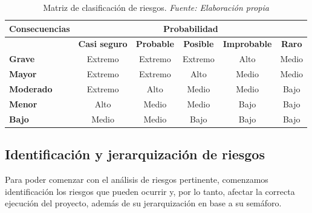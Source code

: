 \begin{table}[H]
	\centering
	\begin{tabular}{|>{\centering\arraybackslash}m{2.5cm}|c|c|c|c|c|}
		\hline
		\rowcolor{black!75} \color{white} {\textbf{Consecuencias}} & \multicolumn{5}{c|}{ \color{white} \textbf{Probabilidad}} \\ \cline{2-6}
		\cellcolor{white} & \textbf{Casi seguro} & \textbf{Probable} & \textbf{Posible} & \textbf{Improbable} & \textbf{Raro} \\ \hline
		\textbf{Grave} & \cellcolor{red!80}Extremo & \cellcolor{red!80}Extremo & \cellcolor{red!80}Extremo & \cellcolor{orange!80}Alto & \cellcolor{yellow!60}Medio \\ \hline
		\textbf{Mayor} & \cellcolor{red!80}Extremo & \cellcolor{red!80}Extremo & \cellcolor{orange!80}Alto & \cellcolor{yellow!60}Medio & \cellcolor{yellow!60}Medio \\ \hline
		\textbf{Moderado} & \cellcolor{red!80}Extremo & \cellcolor{orange!80}Alto & \cellcolor{yellow!60}Medio & \cellcolor{yellow!60}Medio & \cellcolor{green!60}Bajo \\ \hline
		\textbf{Menor} & \cellcolor{orange!80}Alto & \cellcolor{yellow!60}Medio & \cellcolor{yellow!60}Medio & \cellcolor{green!60}Bajo & \cellcolor{green!60}Bajo \\ \hline
		\textbf{Bajo} & \cellcolor{yellow!60}Medio & \cellcolor{yellow!60}Medio & \cellcolor{green!60}Bajo & \cellcolor{green!60}Bajo & \cellcolor{green!60}Bajo \\ \hline
	\end{tabular}
	\caption[Matriz de clasificación de riesgos.]{Matriz de clasificación de riesgos. \textit{Fuente: Elaboración propia}}
	\label{tabla:matriz_riesgos}
\end{table}


\subsection{Identificación y jerarquización de riesgos}
Para poder comenzar con el análisis de riesgos pertinente, comenzamos identificación los riesgos que pueden ocurrir y, por lo tanto, afectar la correcta ejecución del proyecto, además de su jerarquización en base a su semáforo.

